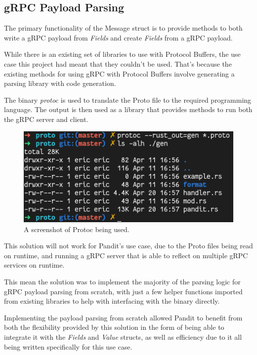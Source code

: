 \documentclass[a4paper,12pt]{report}
\begin{document}
\subsection{gRPC Payload Parsing}

The primary functionality of the Message struct is to provide methods to both write a gRPC payload from \textit{Fields} and create \textit{Fields}
from a gRPC payload.

While there is an existing set of libraries to use with Protocol Buffers, the use case this project had meant that they couldn't be used.
That's because the existing methods for using gRPC with Protocol Buffers involve generating a parsing library with code generation.

The binary \textit{protoc \cite{protoc}} is used to translate the Proto file to the required programming language. The output is then used as
a library that provides methods to run both the gRPC server and client.

\begin{figure}[hbt!]
    \centering
    \includegraphics[width=\linewidth]{protocc.png}
    \caption{A screenshot of Protoc being used.}
    \label{fig:admin}
\end{figure}

This solution will not work for Pandit's use case, due to the Proto files being read on runtime, and running a gRPC server that is able to reflect
on multiple gRPC services on runtime.

This mean the solution was to implement the majority of the parsing logic for gRPC payload parsing from scratch, with just a few helper functions imported from existing libraries to help with interfacing with the binary directly.

Implementing the payload parsing from scratch allowed Pandit to benefit from both the flexibility provided by this solution in the form of being able to integrate it with the \textit{Fields} and \textit{Value} structs, as well as efficiency due to it all being written specifically for this use case.
\end{document}
